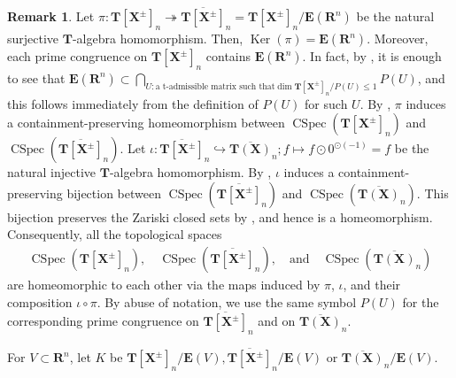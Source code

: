 \documentclass[a4paper,12pt]{amsart}
\theoremstyle{plain}
\theoremstyle{definition}
\newtheorem{remark}[theorem]{Remark}
\begin{document}
\begin{remark}
    \label{rem1}
Let $\pi : \boldsymbol{T}[\boldsymbol{X}^{\pm}]_n \twoheadrightarrow \overline{\boldsymbol{T}[\boldsymbol{X}^{\pm}]}_n = \boldsymbol{T}[\boldsymbol{X}^{\pm}]_n / \boldsymbol{E}(\boldsymbol{R}^n)$ be the natural surjective $\boldsymbol{T}$-algebra homomorphism.
Then, $\operatorname{Ker}(\pi) = \boldsymbol{E}(\boldsymbol{R}^n)$.
Moreover, each prime congruence on $\boldsymbol{T}[\boldsymbol{X}^{\pm}]_n$ contains $\boldsymbol{E}(\boldsymbol{R}^n)$.
In fact, by \cite[Theorem~5.4(i)]{Joo=Mincheva}, it is enough to see that $\boldsymbol{E}(\boldsymbol{R}^n) \subset \bigcap_{U : \text{a t-admissible matrix such that} \operatorname{dim}\boldsymbol{T}[\boldsymbol{X}^{\pm}]_n / P(U) \le 1}P(U)$, and this follows immediately from the definition of $P(U)$ for such $U$.
By \cite[Proposition~2.13]{Joo=Mincheva2}, $\pi$ induces a containment-preserving homeomorphism between $\operatorname{CSpec}(\boldsymbol{T}[\boldsymbol{X}^{\pm}]_n)$ and $\operatorname{CSpec}(\overline{\boldsymbol{T}[\boldsymbol{X}^{\pm}]}_n)$.
Let $\iota: \overline{\boldsymbol{T}[\boldsymbol{X}^{\pm}]}_n \hookrightarrow \overline{\boldsymbol{T}(\boldsymbol{X})}_n; f \mapsto f \odot 0^{\odot (-1)} = f$ be the natural injective $\boldsymbol{T}$-algebra homomorphism.
By \cite[Proposition~3.9(iii)]{Joo=Mincheva2}, $\iota$ induces a containment-preserving bijection between $\operatorname{CSpec}(\overline{\boldsymbol{T}[\boldsymbol{X}^{\pm}]}_n)$ and $\operatorname{CSpec}(\overline{\boldsymbol{T}(\boldsymbol{X})}_n)$.
This bijection preserves the Zariski closed sets by \cite[Proposition~3.9(i)--(iii)]{Joo=Mincheva2}, and hence is a homeomorphism.
Consequently, all the topological spaces 
\begin{align*}
\operatorname{CSpec}(\boldsymbol{T}[\boldsymbol{X}^{\pm}]_n), \quad \operatorname{CSpec}(\overline{\boldsymbol{T}[\boldsymbol{X}^{\pm}]}_n), \quad \text{and} \quad \operatorname{CSpec}(\overline{\boldsymbol{T}(\boldsymbol{X})}_n)
\end{align*}
are homeomorphic to each other via the maps induced by $\pi$, $\iota$, and their composition $\iota\circ\pi$.
By abuse of notation, we use the same symbol $P(U)$ for the corresponding prime congruence on $\overline{\boldsymbol{T}[\boldsymbol{X}^{\pm}]}_n$ and on $\overline{\boldsymbol{T}(\boldsymbol{X})}_n$.
\end{remark}

For $V \subset \boldsymbol{R}^n$, let $K$ be $\boldsymbol{T}[\boldsymbol{X}^{\pm}]_n / \boldsymbol{E}(V), \overline{\boldsymbol{T}[\boldsymbol{X}^{\pm}]}_n / \boldsymbol{E}(V)$ or $\overline{\boldsymbol{T}(\boldsymbol{X})}_n / \boldsymbol{E}(V)$.
\end{document}
